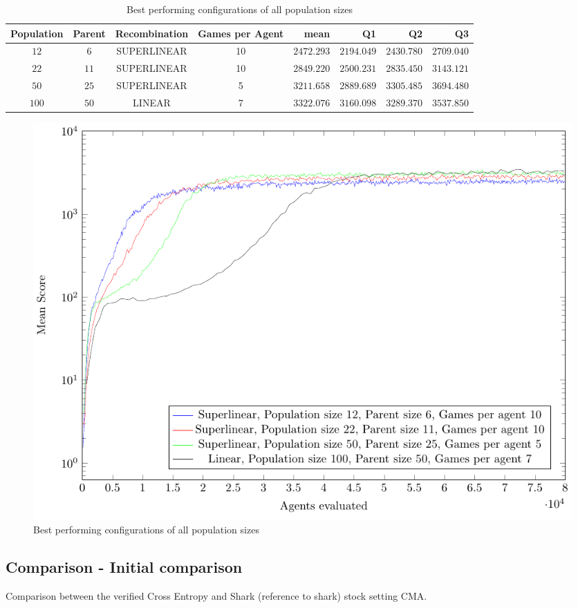 \begin{table}[H]
\centering
\small
\begin{tabular}{c c c c r r r r}
Population & Parent & Recombination & Games per Agent & mean & Q1 & Q2 & Q3\\
\hline
$12$ & $6$ & SUPERLINEAR & 10 & $2472.293$ & $2194.049$ & $2430.780$ & $2709.040$\\
$22$ & $11$ & SUPERLINEAR & 10 & $2849.220$ & $2500.231$ & $2835.450$ & $3143.121$\\
$50$ & $25$ & SUPERLINEAR & 5 & $3211.658$ & $2889.689$ & $3305.485$ & $3694.480$\\
$100$ & $50$ & LINEAR & 7 & $3322.076$ & $3160.098$ & $3289.370$ & $3537.850$\\
\end{tabular}
\caption{Best performing configurations of all population sizes}
\end{table}

\begin{figure}[H]
\centering
\includegraphics[scale=1]{data/cma_population_offspring/bestofall_population/PlotFile.pdf}
\caption{Best performing configurations of all population sizes}
\end{figure}



\clearpage

\subsection{Comparison - Initial comparison}
Comparison between the verified Cross Entropy and Shark (reference to shark) stock setting CMA.

